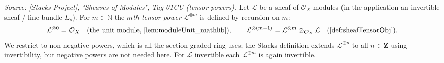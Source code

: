 \begin{definition}
  \label{def:sheafTensorPow}
  \textit{Source: [Stacks Project], "Sheaves of Modules", Tag 01CU (tensor
  powers).}
  Let \(\mathcal{L}\) be a sheaf of \(\mathcal{O}_X\)-modules (in the application
  an invertible sheaf / line bundle \(L_s\)). For \(m \in \mathbb{N}\) the
  \emph{\(m\)th tensor power} \(\mathcal{L}^{\otimes m}\) is defined by recursion
  on \(m\):
  \[
    \mathcal{L}^{\otimes 0} = \mathcal{O}_X
      \quad(\text{the unit module, \cref{lem:moduleUnit_mathlib}}),
    \qquad
    \mathcal{L}^{\otimes (m+1)}
      = \mathcal{L}^{\otimes m} \otimes_{\mathcal{O}_X} \mathcal{L}
        \quad(\cref{def:sheafTensorObj}).
  \]
  We restrict to non-negative powers, which is all the section graded ring uses;
  the Stacks definition extends \(\mathcal{L}^{\otimes n}\) to all
  \(n \in \mathbf{Z}\) using invertibility, but negative powers are not needed
  here. For \(\mathcal{L}\) invertible each \(\mathcal{L}^{\otimes m}\) is again
  invertible.
\end{definition}

